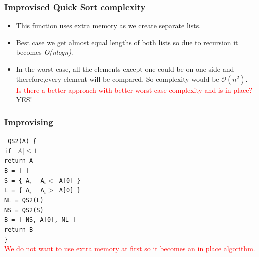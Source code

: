 \begin{frame}
    \frametitle{Improvised Quick Sort complexity}
    \begin{itemize}
        \item This function uses extra memory as we create separate lists.\\
        \vspace{0.2cm}
        \item Best case we get almost equal lengths of both lists so due to recursion it becomes \textit{O(nlogn)}.\\
        \vspace{0.2cm}
        \item In the worst case, all the elements except one could be on one side and therefore,every element will be compared. So complexity would be \(\mathcal{O}(n^2)\). \\
        \vspace{0.3cm}
        \textcolor{red}{Is there a better approach with better worst case complexity and is in place?} \\
        \vspace{0.2cm}
        YES!
    \end{itemize}
    
\end{frame}


\begin{frame}
    \frametitle{Improvising}
         \texttt{
        QS2(A) \{ \\
        \quad if $|A| \leq 1$ \\
        \quad return A \\
        \quad B = [ ] \\
        \quad S = \{ A$_i$ $|$ A$_i < $ A[0] \} \\
        \quad L = \{ A$_i$ $|$ A$_i > $ A[0] \} \\
        \quad NL = QS2(L) \\
        \quad NS = QS2(S) \\
        \quad B = [ NS, A[0], NL ] \\
        \quad return B \\
        \} \\
        }
        \vspace{0.3cm}
        \textcolor{red}{We do not want to use extra memory at first so it becomes an in place algorithm.}
\end{frame}


